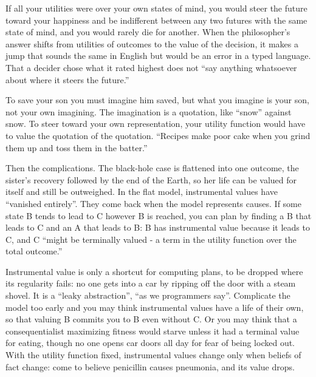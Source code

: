 If all your utilities were over your own states of mind, you would steer the future toward your happiness and be indifferent between any two futures with the same state of mind, and you would rarely die for another. When the philosopher's answer shifts from utilities of outcomes to the value of the decision, it makes a jump that sounds the same in English but would be an error in a typed language. That a decider chose what it rated highest does not ``say anything whatsoever about where it steers the future.'' 

To save your son you must imagine him saved, but what you imagine is your son, not your own imagining. The imagination is a quotation, like ``snow'' against snow. To steer toward your own representation, your utility function would have to value the quotation of the quotation. ``Recipes make poor cake when you grind them up and toss them in the batter.''

Then the complications. The black-hole case is flattened into one outcome, the sister's recovery followed by the end of the Earth, so her life can be valued for itself and still be outweighed. In the flat model, instrumental values have ``vanished entirely''. They come back when the model represents causes. If some state B tends to lead to C however B is reached, you can plan by finding a B that leads to C and an A that leads to B: B has instrumental value because it leads to C, and C ``might be terminally valued - a term in the utility function over the total outcome.''

Instrumental value is only a shortcut for computing plans, to be dropped where its regularity fails: no one gets into a car by ripping off the door with a steam shovel. It is a ``leaky abstraction'', ``as we programmers say''.  Complicate the model too early and you may think instrumental values have a life of their own, so that valuing B commits you to B even without C. Or you may think that a consequentialist maximizing fitness would starve unless it had a terminal value for eating, though no one opens car doors all day for fear of being locked out. With the utility function fixed, instrumental values change only when beliefs of fact change: come to believe penicillin causes pneumonia, and its value drops.

